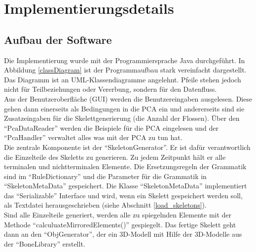 \chapter{Implementierungsdetails}
\label{chapter:implementation_detail}


\section{Aufbau der Software}

Die Implementierung wurde mit der Programmiersprache Java durchgeführt. In Abbildung \ref{classDiagram} ist der Programmaufbau stark vereinfacht dargestellt. Das Diagramm ist an UML-Klassendiagramme angelehnt. Pfeile stehen jedoch nicht für Teilbeziehungen oder Vererbung, sondern für den Datenfluss.\\
Aus der Benutzeroberfläche (GUI) werden die Benutzereingaben ausgelesen. Diese gehen dann einerseits als Bedingungen in die PCA ein und andererseits sind sie Zusatzeingaben für die Skelettgenerierung (\zb die Anzahl der Flossen). 
Über den "`PcaDataReader"' werden die Beispiele für die PCA eingelesen und der "`PcaHandler"' verwaltet alles was mit der PCA zu tun hat.\\
Die zentrale Komponente ist der "`SkeletonGenerator"'. Er ist dafür verantwortlich die Einzelteile des Skeletts zu generieren. Zu jedem Zeitpunkt hält er alle terminalen und nichtterminalen Elemente. Die Ersetzungsregeln der Grammatik sind im "`RuleDictionary"' und die Parameter für die Grammatik in "`SkeletonMetaData"' gespeichert. Die Klasse "`SkeletonMetaData"' implementiert das "`Serializable"' Interface \cite{JavaSerialization} und wird, wenn ein Skelett gespeichert werden soll, als Textdatei herausgeschrieben (siehe Abschnitt \ref{load_skeletons}).\\
Sind alle Einzelteile generiert, werden alle zu spiegelnden Elemente mit der Methode "`calculuateMirroredElements()"' gespiegelt. Das fertige Skelett geht dann an den "`ObjGenerator"', der ein 3D-Modell mit Hilfe der 3D-Modelle aus der "`BoneLibrary"' erstellt.

